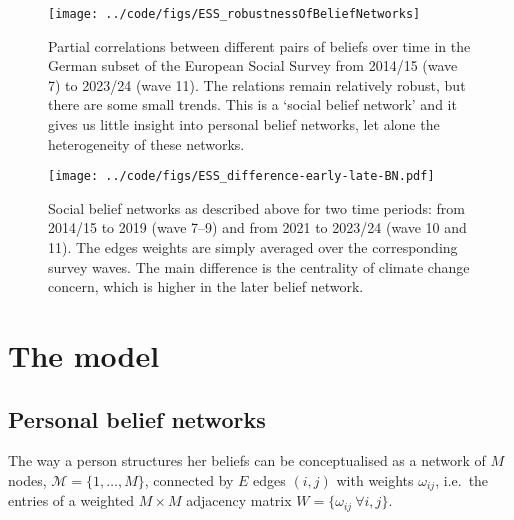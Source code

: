 \documentclass[10pt]{article}
\begin{document}
\begin{figure}
    \centering
    \texttt{[image: ../code/figs/ESS\_robustnessOfBeliefNetworks]}
    \caption{Partial correlations between different pairs of beliefs over time in the German subset of the European Social Survey from 2014/15 (wave 7) to 2023/24 (wave 11). The relations remain relatively robust, but there are some small trends. This is a `social belief network' and it gives us little insight into personal belief networks, let alone the heterogeneity of these networks.}
\end{figure}



\begin{figure}
    \centering
    \texttt{[image: ../code/figs/ESS\_difference-early-late-BN.pdf]}
    \caption{Social belief networks as described above for two time periods: from 2014/15 to 2019 (wave 7--9) and from 2021 to 2023/24 (wave 10 and 11). The edges weights are simply averaged over the corresponding survey waves. The main difference is the centrality of climate change concern, which is higher in the later belief network. }
\end{figure}


\FloatBarrier
\section{The model}

\subsection{Personal belief networks}

The way a person structures her beliefs can be conceptualised as a network of $M$ nodes, $\mathcal{M}=\{1, \ldots, M\}$, connected by $E$ edges $(i,j)$ with weights $\omega_{ij}$, i.e.\ the entries of a weighted $M \times M$ adjacency matrix $W = \{\omega_{ij} \  \forall i,j\}$. %
\end{document}
